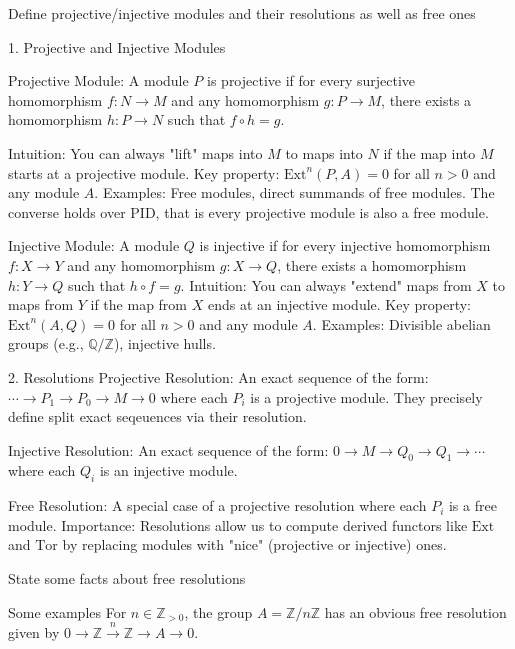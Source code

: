Define projective/injective modules and their resolutions as well as free ones

1. Projective and Injective Modules

Projective Module: A module \( P \) is projective if for every surjective homomorphism \( f: N → M \) and any homomorphism \( g: P → M \), 
there exists a homomorphism \( h: P → N \) such that \(f ∘ h = g\).



Intuition: You can always "lift" maps into \( M \) to maps into \( N \) if the map into \( M \) starts at a projective module.
Key property: \( \text{Ext}^n(P, A) = 0 \) for all \( n > 0 \) and any module \( A \).
Examples: Free modules, direct summands of free modules.
The converse holds over PID, that is every projective module is also a free module. 

Injective Module: A module \( Q \) is injective if for every injective homomorphism \( f: X → Y \) and any homomorphism \( g: X \to Q \), 
there exists a homomorphism \( h: Y → Q \) such that \( h ∘ f = g \).
Intuition: You can always "extend" maps from \( X \) to maps from \( Y \) if the map from \( X \) ends at an injective module.
Key property: \( \text{Ext}^n(A, Q) = 0 \) for all \( n > 0 \) and any module \( A \).
Examples: Divisible abelian groups (e.g., \( \mathbb{Q}/\mathbb{Z} \)), injective hulls.

2. Resolutions
Projective Resolution: An exact sequence of the form:
\(\cdots \longrightarrow P_1 \longrightarrow P_0 \longrightarrow M \longrightarrow 0\)
where each \( P_i \) is a projective module.
They precisely define split exact seqeuences via their resolution.

Injective Resolution: An exact sequence of the form:
\(0 \longrightarrow M \longrightarrow Q_0 \longrightarrow Q_1 \longrightarrow \cdots \)
where each \( Q_i \) is an injective module.

Free Resolution: A special case of a projective resolution where each \( P_i \) is a free module.
Importance: Resolutions allow us to compute derived functors like \( \text{Ext} \) and \( \text{Tor} \) by replacing modules with 
"nice" (projective or injective) ones.


State some facts about free resolutions

Some examples 
For \(n \in \mathbb{Z}_{>0}\), the group \(A = \mathbb{Z} / n \mathbb{Z}\) has an obvious free resolution given by
\(0 \longrightarrow \mathbb{Z} \xrightarrow{n} \mathbb{Z} \longrightarrow A \longrightarrow 0.\)

